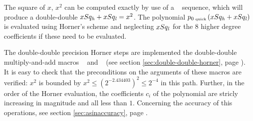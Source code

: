 The square of $x$, $x^2$ can be computed exactly by use of a \Mul~
sequence, which will produce a double-double $xSq_{\mathit{h}} + xSq_{\mathit{l}} =
x^2$. The polynomial $p_{0\mbox{\tiny ~quick}}\left( xSq_{\mathit{h}} + xSq_{\mathit{l}}
\right)$ is evaluated using Horner's scheme and neglecting $xSq_{\mathit{l}}$
for the $8$ higher degree coefficients if these need to be evaluated. 

The double-double precision Horner steps are implemented the
double-double multiply-and-add macros \MulAddDD~ and \MulAddDdD~ (see
section \ref{sec:double-double-horner}, page
\pageref{sec:double-double-horner}). It is easy to check that the
preconditions on the arguments of these macros are verified: $x^2$ is
bounded by $x^2 \leq \left(2^{-2.434403}\right)^2 \leq 2^{-4}$ in this
path. Further, in the order of the Horner evaluation, the coefficients
$c_i$ of the polynomial are stricly increasing in magnitude and all
less than $1$.  Concerning the accuracy of this operations, see
section \ref{sec:asinaccuracy}, page \pageref{sec:asinaccuracy}.

